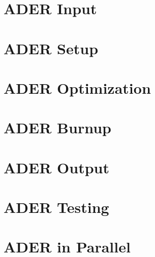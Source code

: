 \documentclass{article}
\begin{document}
\section{ADER Input} \label{sec:ader_input}


\section{ADER Setup} \label{sec:ader_setup}


\section{ADER Optimization} \label{sec:ader_opt}


\section{ADER Burnup} \label{sec:ader_burn}


\section{ADER Output} \label{sec:ader_output}


\section{ADER Testing} \label{sec:ader_test}


\section{ADER in Parallel} \label{sec:ader_para}

\end{document}
